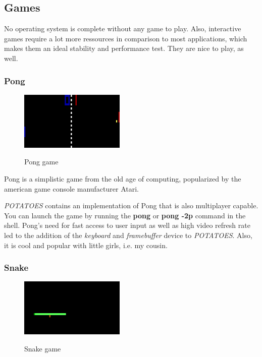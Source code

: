 \documentclass[11pt,a4paper]{scrartcl}
\begin{document}
\subsection{Games}

No operating system is complete without any game to play. Also, interactive games require a lot more ressources in comparison to most applications, which makes them an ideal stability and performance test. They are nice to play, as well.

\subsubsection{Pong}

\begin{figure}
\centering
{\includegraphics[width=5cm]{pong.png}}
\caption {Pong game}
\end{figure}

Pong is a simplistic game from the old age of computing, popularized by the american game console manufacturer Atari. 

\textit{POTATOES} contains an implementation of Pong that is also multiplayer capable. You can launch the game by running the \textbf{pong} or \textbf{pong -2p} command in the shell.
Pong's need for fast access to user input as well as high video refresh rate led to the addition of the \textit{keyboard} and \textit{framebuffer} device to \textit{POTATOES}. Also, it is cool and popular with little girls, i.e. my cousin.

\subsubsection{Snake}

\begin{figure}
\centering
{\includegraphics[width=5cm]{snake.png}}
\caption {Snake game}
\end{figure}
\end{document}
